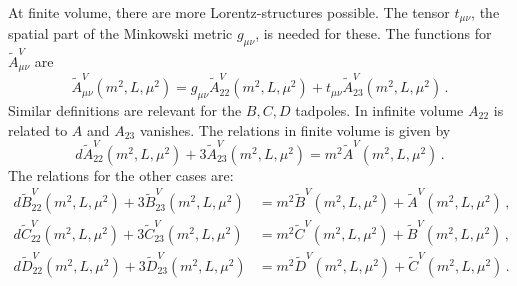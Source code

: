 \documentclass[12pt,a4paper]{article}
\begin{document}
At finite volume, there are more Lorentz-structures possible. 
The tensor $t_{\mu\nu}$, the spatial part of the Minkowski metric
$g_{\mu\nu}$, is needed for these.
The functions for $\tilde A^V_{\mu\nu}$ are
\begin{equation}
\tilde A^V_{\mu\nu}(m^2,L,\mu^2) = g_{\mu\nu}\tilde A^V_{22}(m^2,L,\mu^2)+t_{\mu\nu}\tilde A^V_{23}(m^2,L,\mu^2)\,.
\end{equation}
Similar definitions are relevant for the $B,C,D$ tadpoles.
In infinite volume $A_{22}$ is related to $A$ and $A_{23}$ vanishes.
The relations in finite volume is given by
\begin{equation}
d\tilde A^V_{22}(m^2,L,\mu^2)+3\tilde A^V_{23}(m^2,L,\mu^2) =
 m^2\tilde A^V(m^2,L,\mu^2)\,.
\end{equation}
The relations for the other cases are:
\begin{align}
d\tilde B^V_{22}(m^2,L,\mu^2)+3\tilde B^V_{23}(m^2,L,\mu^2)& =
 m^2\tilde B^V(m^2,L,\mu^2)+\tilde A^V(m^2,L,\mu^2)\,,\nonumber\\
d\tilde C^V_{22}(m^2,L,\mu^2)+3\tilde C^V_{23}(m^2,L,\mu^2)& =
 m^2\tilde C^V(m^2,L,\mu^2)+\tilde B^V(m^2,L,\mu^2)\,,\nonumber\\
d\tilde D^V_{22}(m^2,L,\mu^2)+3\tilde D^V_{23}(m^2,L,\mu^2)& =
 m^2\tilde D^V(m^2,L,\mu^2)+\tilde C^V(m^2,L,\mu^2)\,.
\end{align}
\end{document}

